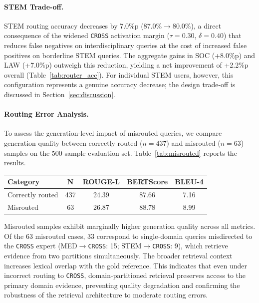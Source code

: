 \documentclass[a4paper,fleql]{cas-sc}
\begin{document}
\paragraph{STEM Trade-off.}
STEM routing accuracy decreases by 7.0\%p (87.0\%$\to$80.0\%), a direct
consequence of the widened \texttt{CROSS} activation margin ($\tau{=}0.30$,
$\delta{=}0.40$) that reduces false negatives on interdisciplinary queries
at the cost of increased false positives on borderline STEM queries. The
aggregate gains in SOC (+8.0\%p) and LAW (+7.0\%p) outweigh this reduction,
yielding a net improvement of +2.2\%p overall (Table~\ref{tab:router_acc}).
For individual STEM users, however, this configuration represents a genuine
accuracy decrease; the design trade-off is discussed in
Section~\ref{sec:discussion}.

\paragraph{Routing Error Analysis.}
To assess the generation-level impact of misrouted queries, we compare
generation quality between correctly routed ($n{=}437$) and misrouted
($n{=}63$) samples on the 500-sample evaluation set.
Table~\ref{tab:misrouted} reports the results.

\vspace{4pt}
\begin{center}
\begingroup
{}
\label{tab:misrouted}
\begin{tabular}{lcccc}
\toprule
\textbf{Category} & \textbf{N} & \textbf{ROUGE-L} & \textbf{BERTScore} & \textbf{BLEU-4} \\
\midrule
Correctly routed & 437 & 24.39 & 87.66 & 7.16 \\
Misrouted        &  63 & 26.87 & 88.78 & 8.99 \\
\bottomrule
\end{tabular}
\endgroup
\end{center}
\vspace{4pt}

Misrouted samples exhibit marginally higher generation quality across all
metrics. Of the 63 misrouted cases, 33 correspond to single-domain queries
misdirected to the \texttt{CROSS} expert (MED$\to$\texttt{CROSS}: 15;
STEM$\to$\texttt{CROSS}: 9), which retrieve evidence from two partitions
simultaneously. The broader retrieval context increases lexical overlap with
the gold reference. This indicates that even under incorrect routing to
\texttt{CROSS}, domain-partitioned retrieval preserves access to the primary
domain evidence, preventing quality degradation and confirming the robustness
of the retrieval architecture to moderate routing errors.
\end{document}
